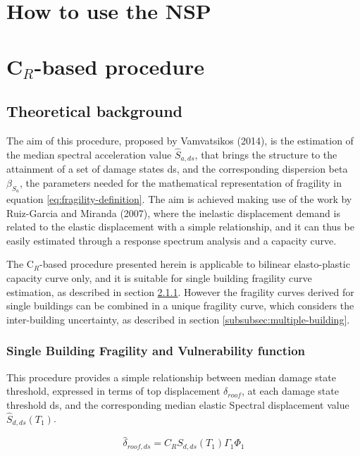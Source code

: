 

\section{How to use the NSP}
\label{sec:NSP}


\section{C$_R$-based procedure}
\label{sec:CR}
\subsection{Theoretical background}
The aim of this procedure, proposed by Vamvatsikos (2014), is the estimation of the median spectral acceleration value $\hat{S}_{a,ds}$, that brings the structure to the attainment of a set of damage states ds, and the corresponding dispersion beta $\beta_{S_a}$, the parameters needed for the mathematical representation of fragility in equation \ref{eq:fragility-definition}. The aim is achieved making use of the work by Ruiz-Garcia and Miranda (2007), where the inelastic displacement demand is related to the elastic displacement with a simple relationship, and it can thus be easily estimated through a response spectrum analysis and a capacity curve.

The C$_R$-based procedure presented herein is applicable to bilinear elasto-plastic capacity curve only, and it is suitable for single building fragility curve estimation, as described in section \ref{subsubsec:single-building}. However the fragility curves derived for single buildings can be combined in a unique fragility curve, which considers the inter-building uncertainty, as described in section \ref{subsubsec:multiple-building}.

\subsubsection{Single Building Fragility and Vulnerability function}
\label{subsubsec:single-building}
This procedure provides a simple relationship between median damage state threshold, expressed in terms of top displacement $\delta_{roof}$, at each damage state threshold ds, and the corresponding median elastic Spectral displacement value $\hat{S}_{d,ds}(T_1)$.

\begin{equation}
\hat{\delta}_{roof, ds} = C_R S_{d, ds}(T_1) \Gamma_1 \Phi_1
\end{equation}

